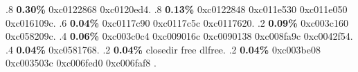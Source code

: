 \begin{profile}
{.8 \textbf{0.30\%} 0xc0122868\newline {} 0xc0120ed4. 
.8 \textbf{0.13\%} 0xc0122848\newline {} 0xc011e530\newline {} 0xc011e050\newline {} 0xc016109c. 
.6 \textbf{0.04\%} 0xc0117c90\newline {} 0xc0117c5c\newline {} 0xc0117620. 
.2 \textbf{0.09\%} 0xc003c160\newline {} 0xc058209c. 
.4 \textbf{0.06\%} 0xc003c0c4\newline {} 0xc009016c\newline {} 0xc0090138\newline {} 0xc008fa9c\newline {} 0xc0042f54. 
.4 \textbf{0.04\%} 0xc0581768. 
.2 \textbf{0.04\%} closedir\newline {} free\newline {} dlfree. 
.2 \textbf{0.04\%} 0xc003be08\newline {} 0xc003503c\newline {} 0xc006fed0\newline {} 0xc006faf8\newline {} \newline {} \newline {} \newline {} . 
}
\end{profile}

